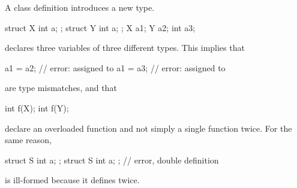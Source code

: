 \pnum
A class definition introduces a new type.
\begin{example}
\begin{codeblock}
struct X { int a; };
struct Y { int a; };
X a1;
Y a2;
int a3;
\end{codeblock}
declares three variables of three different types. This implies that
\begin{codeblock}
a1 = a2;                        // error:  assigned to 
a1 = a3;                        // error:  assigned to 
\end{codeblock}
are type mismatches, and that
\begin{codeblock}
int f(X);
int f(Y);
\end{codeblock}
%
declare an overloaded function  and not
simply a single function  twice. For the same reason,
\begin{codeblock}
struct S { int a; };
struct S { int a; };            // error, double definition
\end{codeblock}
is ill-formed because it defines  twice.
\end{example}

